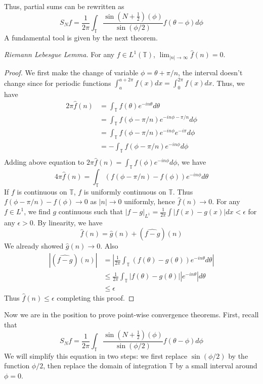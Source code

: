 \documentclass[12pt]{article}
\newenvironment{theorem}[1][Theorem.]{\begin{trivlist}
\item[\hskip \labelsep {\bfseries #1}]}{\end{trivlist}}
\begin{document}
Thus, partial sums can be rewritten as 
\[
S_Nf = \frac{1}{2\pi}\int_{\mathbb{T}}\frac{\sin(N+\frac{1}{2})(\phi)}{\sin(\phi/2)}f(\theta -\phi)d\phi
\]
A fundamental tool is given by the next theorem.
\begin{theorem}{\it Riemann Lebesgue Lemma.}
For any $f\in L^1(\mathbb{T})$, $\lim_{|n| \rightarrow \infty}\hat{f}(n) = 0$.
\end{theorem}
\begin{proof}
We first make the change of variable $\phi = \theta + \pi/n$, the interval doesn't change since for periodic functions $\int_a^{a+2\pi}f(x)dx = \int_0^{2\pi}f(x)dx$. Thus, we have
\begin{align*}
2\pi\hat{f}(n) &= \int_{\mathbb{T}}f(\theta)e^{-in\theta}d\theta \\
&= \int_{\mathbb{T}}f(\phi - \pi/n)e^{-in\phi - \pi/n}d\phi \\
&= \int_{\mathbb{T}}f(\phi - \pi/n)e^{-in\phi}e^{-i\pi}d\phi \\
&= -\int_{\mathbb{T}}f(\phi - \pi/n)e^{-in\phi}d\phi \\
\end{align*}
Adding above equation to $2\pi\hat{f}(n) = \int_{\mathbb{T}}f(\phi)e^{-in\phi}d\phi$, we have
\[
4\pi\hat{f}(n) =\int_{\mathbb{T}}(f(\phi - \pi/n)-f(\phi))e^{-in\phi}d\theta
\]
If $f$ is continuous on $\mathbb{T}$, $f$ is uniformly continuous on $\mathbb{T}$. Thus $f(\phi - \pi/n)-f(\phi) \rightarrow 0$ as $|n| \rightarrow 0$ uniformly, hence $\hat{f}(n) \rightarrow 0$. \newline
For any $f \in L^1$, we find $g$ continuous such that $|f - g|_{L^1} = \frac{1}{2\pi}\int|f(x)-g(x)|dx < \epsilon$ for any $\epsilon > 0$. By linearity, we have
\[
\hat{f}(n) = \hat{g}(n) + (\widehat{f-g})(n)
\]
We already showed $\hat{g}(n) \rightarrow 0$. Also 
\begin{align*}
|(\widehat{f-g})(n)| &= |\frac{1}{2\pi}\int_{\mathbb{T}}(f(\theta)-g(\theta))e^{-in\theta}d\theta| \\
&\leqslant \frac{1}{2\pi}\int_{\mathbb{T}}|f(\theta)-g(\theta)||e^{-in\theta}|d\theta \\
&\leqslant \epsilon
\end{align*}
Thus $\hat{f}(n) \leqslant \epsilon$ completing this proof.
\end{proof}
Now we are in the position to prove point-wise convergence theorems. First, recall that 
\[
S_Nf = \frac{1}{2\pi}\int_{\mathbb{T}}\frac{\sin(N+\frac{1}{2})(\phi)}{\sin(\phi/2)}f(\theta -\phi)d\phi
\]
We will simplify this equation in two steps: we first replace $\sin(\phi/2)$ by the function $\phi/2$, then replace the domain of integration $\mathbb{T}$ by a small interval around $\phi = 0$.
\end{document}
